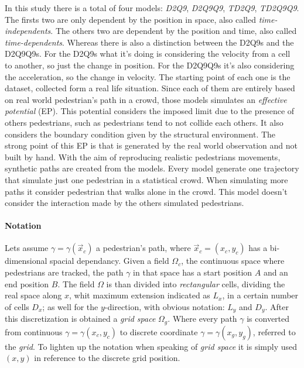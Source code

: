 \documentclass[class=article, crop=false]{standalone}
\begin{document}
In this study there is a total of four models: \emph{D2Q9}, \emph{D2Q9Q9}, \emph{TD2Q9}, \emph{TD2Q9Q9}.
The firsts two are only dependent by the position in space, also called \emph{time-independents}.
The others two are dependent by the position and time, also called \emph{time-dependents}.
Whereas there is also a distinction between the D2Q9s and the D2Q9Q9s.
For the D2Q9s what it's doing is considering the velocity from a cell to another, so just the change in position.
For the D2Q9Q9s it's also considering the acceleration, so the change in velocity.
The starting point of each one is the dataset, collected form a real life situation.
Since each of them are entirely based on real world pedestrian's path in a crowd, those models simulates an \emph{effective potential} (EP).
This potential considers the imposed limit due to the presence of others pedestrians, such as pedestrians tend to not collide each others.
It also considers the boundary condition given by the structural environment.
The strong point of this EP is that is generated by the real world observation and not built by hand.
With the aim of reproducing realistic pedestrians movements, synthetic paths are created from the models.
Every model generate one trajectory that simulate just one pedestrian in a statistical crowd.
When simulating more paths it consider pedestrian that walks alone in the crowd.
This model doesn't consider the interaction made by the others simulated pedestrians.

\paragraph{Notation} Lets assume $\gamma=\gamma( \vec x_c)$ a pedestrian's path, where $\vec x_c = (x_c, y_c)$ has a bi-dimensional spacial dependancy.
Given a field $\Omega_c$, the continuous space where pedestrians are tracked, the path $\gamma$ in that space has a start position $A$ and an end position $B$.
The field $\Omega$ is than divided into \emph{rectangular} cells, dividing the real space along $x$, whit maximum extension indicated as $L_x$, in a certain number of cells $D_x$; 
as well for the $y$-direction, with obvious notation: $L_y$ and $D_y$.
After this discretization is obtained a \emph{grid space} $\Omega_g$.
Where every path $\gamma$ is converted from continuous $\gamma=\gamma(x_c, y_c)$ to discrete coordinate $\gamma=\gamma(x_g, y_g)$, referred to the \emph{grid}.
To lighten up the notation when speaking of \emph{grid space} it is simply used $(x, y)$ in reference to the discrete grid position.
\end{document}
